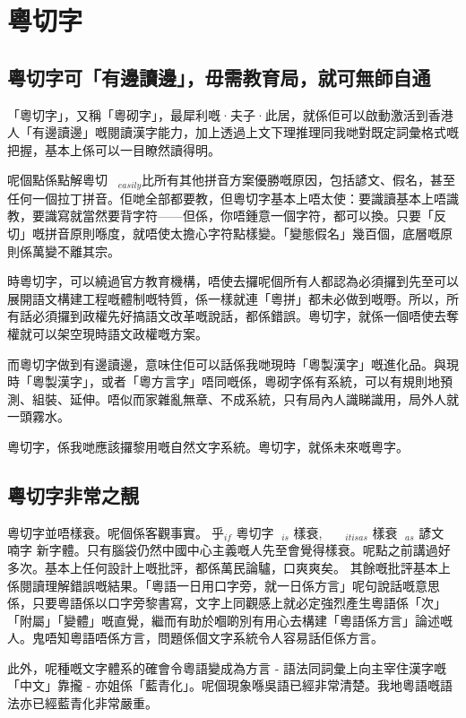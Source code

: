 \chapter{粵切字}

\section{粵切字可「有邊讀邊」，毋需教育局，就可無師自通}

「粵切字」，又稱「粵砌字」，最犀利嘅·夫子·此居，就係佢可以啟動激活到香港人「有邊讀邊」嘅閱讀漢字能力，加上透過上文下理推理同我哋對既定詞彙格式嘅把握，基本上係可以一目瞭然讀得明。

呢個點係點解粵切$_{easily}$比所有其他拼音方案優勝嘅原因，包括諺文、假名，甚至任何一個拉丁拼音。佢哋全部都要教，但粵切字基本上唔太使：要識讀基本上唔識教，要識寫就當然要背字符——但係，你唔鍾意一個字符，都可以換。只要「反切」嘅拼音原則喺度，就唔使太擔心字符點樣變。「變態假名」幾百個，底層嘅原則係萬變不離其宗。

時粵切字，可以繞過官方教育機構，唔使去攞呢個所有人都認為必須攞到先至可以展開語文構建工程嘅體制嘅特質，係一樣就連「粵拼」都未必做到嘅嘢。所以，所有話必須攞到政權先好搞語文改革嘅說話，都係錯誤。粵切字，就係一個唔使去奪權就可以架空現時語文政權嘅方案。

而粵切字做到有邊讀邊，意味住佢可以話係我哋現時「粵製漢字」嘅進化品。與現時「粵製漢字」，或者「粵方言字」唔同嘅係，粵砌字係有系統，可以有規則地預測、組裝、延伸。唔似而家雜亂無章、不成系統，只有局內人識睇識用，局外人就一頭霧水。

粵切字，係我哋應該攞黎用嘅自然文字系統。粵切字，就係未來嘅粵字。

\section{粵切字非常之靚}
粵切字並唔樣衰。呢個係客觀事實。乎$_{if}$ 粵切字 $_{is}$ 樣衰,   $_{it is as}$ 樣衰 $_{as}$ 諺文 喃字 新字體。只有腦袋仍然中國中心主義嘅人先至會覺得樣衰。呢點之前講過好多次。基本上任何設計上嘅批評，都係萬民論驢，口爽爽矣。
其餘嘅批評基本上係閱讀理解錯誤嘅結果。「粵語一日用口字旁，就一日係方言」呢句說話嘅意思係，只要粵語係以口字旁黎書寫，文字上同觀感上就必定強烈產生粵語係「次」「附屬」「變體」嘅直覺，繼而有助於嗰啲別有用心去構建「粵語係方言」論述嘅人。鬼唔知粵語唔係方言，問題係個文字系統令人容易話佢係方言。

此外，呢種嘅文字體系的確會令粵語變成為方言 - 語法同詞彙上向主宰住漢字嘅「中文」靠攏 - 亦姐係「藍青化」。呢個現象喺吳語已經非常清楚。我地粵語嘅語法亦已經藍青化非常嚴重。



